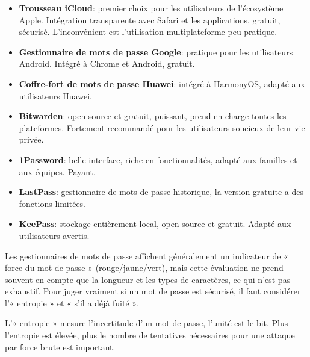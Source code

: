 

\begin{itemize}
  \item \textbf{Trousseau iCloud}: premier choix pour les utilisateurs de l'écosystème Apple. Intégration transparente avec Safari et les applications, gratuit, sécurisé. L'inconvénient est l'utilisation multiplateforme peu pratique.
  \item \textbf{Gestionnaire de mots de passe Google}: pratique pour les utilisateurs Android. Intégré à Chrome et Android, gratuit.
  \item \textbf{Coffre-fort de mots de passe Huawei}: intégré à HarmonyOS, adapté aux utilisateurs Huawei.
\end{itemize}


\begin{itemize}
  \item \textbf{Bitwarden}: open source et gratuit, puissant, prend en charge toutes les plateformes. Fortement recommandé pour les utilisateurs soucieux de leur vie privée.
  \item \textbf{1Password}: belle interface, riche en fonctionnalités, adapté aux familles et aux équipes. Payant.
  \item \textbf{LastPass}: gestionnaire de mots de passe historique, la version gratuite a des fonctions limitées.
  \item \textbf{KeePass}: stockage entièrement local, open source et gratuit. Adapté aux utilisateurs avertis.
\end{itemize}


Les gestionnaires de mots de passe affichent généralement un indicateur de « force du mot de passe » (rouge/jaune/vert), mais cette évaluation ne prend souvent en compte que la longueur et les types de caractères, ce qui n'est pas exhaustif. Pour juger vraiment si un mot de passe est sécurisé, il faut considérer l'« entropie » et « s'il a déjà fuité ».


L'« entropie » mesure l'incertitude d'un mot de passe, l'unité est le bit. Plus l'entropie est élevée, plus le nombre de tentatives nécessaires pour une attaque par force brute est important.

